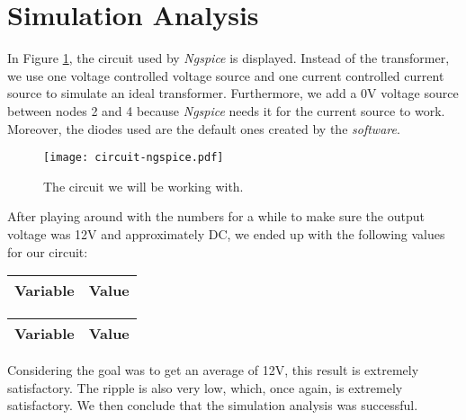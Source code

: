 \clearpage

\section{Simulation Analysis}
\label{sec:simulation}

In Figure \ref{fig:circuit-ngspice}, the circuit used by \textit{Ngspice} is displayed. Instead of the transformer, we use one voltage controlled voltage source and one current controlled current source to simulate an ideal transformer. Furthermore, we add a 0V voltage source between nodes 2 and 4 because \textit{Ngspice} needs it for the current source to work. Moreover, the diodes used are the default ones created by the \textit{software}.

\begin{figure}[h] \centering
\texttt{[image: circuit-ngspice.pdf]}
\caption{The circuit we will be working with.}
\label{fig:circuit-ngspice}
\end{figure}

After playing around with the numbers for a while to make sure the output voltage was 12V and approximately DC, we ended up with the following values for our circuit:

\begin{tabular}{|l|r|}
  \hline    
  {\bf Variable} & {\bf Value} \\ \hline
  
\end{tabular}

\begin{tabular}{|l|r|}
  \hline    
  {\bf Variable} & {\bf Value} \\ \hline
  
\end{tabular}

Considering the goal was to get an average of 12V, this result is extremely satisfactory. The ripple is also very low, which, once again, is extremely satisfactory. We then conclude that the simulation analysis was successful.